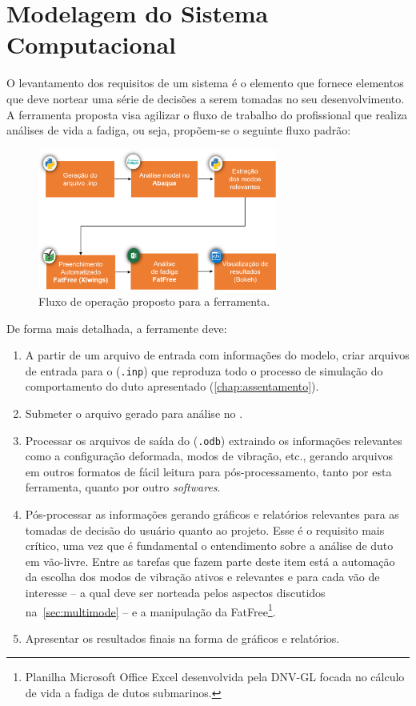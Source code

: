 \chapter{Modelagem do Sistema Computacional}\label{sec:software}

O levantamento dos requisitos de um sistema é o elemento que fornece elementos que deve nortear uma série de decisões a serem tomadas no seu desenvolvimento. A ferramenta proposta visa agilizar o fluxo de trabalho do profissional que realiza análises de vida a fadiga, ou seja, propõem-se o seguinte fluxo padrão:

\begin{figure}[!ht]
    \centering
    \caption{Fluxo de operação proposto para a ferramenta.}\label{fig:workflow}
    \includegraphics[width=0.7\textwidth]{imagens/workflow}
\end{figure}

De forma mais detalhada, a ferramente deve:

\begin{enumerate}
    \item A partir de um arquivo de entrada com informações do modelo, criar arquivos de entrada para o \abaqus (\texttt{.inp}) que reproduza todo o processo de simulação do comportamento do duto apresentado (\autoref{chap:assentamento}).
    \item Submeter o arquivo gerado para análise no \abaqus.\@
    \item Processar os arquivos de saída do \abaqus (\texttt{.odb}) extraindo os informações relevantes como a configuração deformada, modos de vibração, etc., gerando arquivos em outros formatos de fácil leitura para pós-processamento, tanto por esta ferramenta, quanto por outro \textit{softwares}.
    \item Pós-processar as informações gerando gráficos e relatórios relevantes para as tomadas de decisão do usuário quanto ao projeto. Esse é o requisito mais crítico, uma vez que é fundamental o entendimento sobre a análise de duto em vão-livre. Entre as tarefas que fazem parte deste item está a automação da escolha dos modos de vibração ativos e relevantes e para cada vão de interesse -- a qual deve ser norteada pelos aspectos discutidos na~\autoref{sec:multimode} -- e a manipulação da FatFree\footnote{Planilha Microsoft Office Excel desenvolvida pela DNV-GL focada no cálculo de vida a fadiga de dutos submarinos.}.
    \item Apresentar os resultados finais na forma de gráficos e relatórios.
\end{enumerate}

